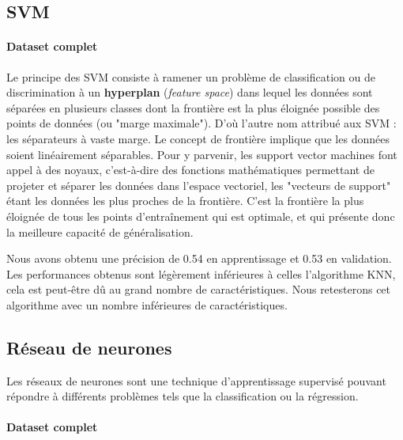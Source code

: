 \subsection{SVM}
\label{sec:svm}

\paragraph{Dataset complet}
\label{par:dataset-complet-svm}

Le principe des SVM consiste à ramener un problème de classification ou de discrimination à un \textbf{hyperplan} (\textit{feature space})
dans lequel les données sont séparées en plusieurs classes dont la frontière est la plus éloignée possible des points de
données (ou "marge maximale"). D'où l'autre nom attribué aux SVM : les séparateurs à vaste marge. Le concept de frontière
implique que les données soient linéairement séparables. Pour y parvenir, les support vector machines font appel à des noyaux,
c'est-à-dire des fonctions mathématiques permettant de projeter et séparer les données dans l'espace vectoriel, les "vecteurs
de support" étant les données les plus proches de la frontière. C'est la frontière la plus éloignée de tous les points d'entraînement
qui est optimale, et qui présente donc la meilleure capacité de généralisation.

Nous avons obtenu une précision de 0.54 en apprentissage et 0.53 en validation. Les performances obtenus sont légèrement inférieures à
celles l'algorithme KNN, cela est peut-être dû au grand nombre de caractéristiques. Nous retesterons cet algorithme avec un nombre inférieures
de caractéristiques.

\subsection{Réseau de neurones}
\label{sec:neurones}

Les réseaux de neurones sont une technique d'apprentissage supervisé pouvant répondre à différents problèmes tels que
la classification ou la régression.

\paragraph{Dataset complet}
\label{par:dataset-complet-neurones}

